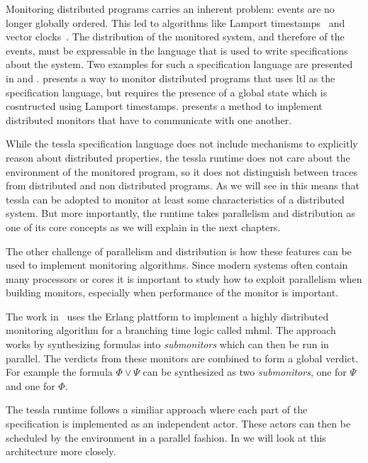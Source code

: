 Monitoring distributed programs carries an inherent problem: events are no longer globally ordered.
This led to algorithms like Lamport timestamps~\citep{Lamport1978} and vector clocks~\citep{Fidge1988}.
The distribution of the monitored system, and therefore of the events, must be expressable in the language that is used to write specifications about the system.
Two examples for such a specification language are presented in \cite{Sen2004} and \cite{Ehrich2000}.
\cite{Mostafa2015} presents a way to monitor distributed programs that uses \gls{ltl} as the specification language, but requires the presence of a global state which is cosntructed using Lamport timestamps.
\cite{Mostafa2015} presents a method to implement distributed monitors that have to communicate with one another.

While the \gls{tessla} specification language does not include mechanisms to explicitly reason about distributed properties, the \gls{tessla} runtime does not care about the environment of the monitored program, so it does not distinguish between traces from distributed and non distributed programs.
As we will see in  this means that \gls{tessla} can be adopted to monitor at least some characteristics of a distributed system.
But more importantly, the runtime takes parallelism and distribution as one of its core concepts as we will explain in the next chapters.

The other challenge of parallelism and distribution is how these features can be used to implement monitoring algorithms.
Since modern systems often contain many processors or cores it is important to study how to exploit parallelism when building monitors, especially when performance of the monitor is important.

The work in~\cite{Attard2016} uses the Erlang plattform to implement a highly distributed monitoring algorithm for a branching time logic called \gls{mhml}.
The approach works by synthesizing formulas into \emph{submonitors} which can then be run in parallel.
The verdicts from these monitors are combined to form a global verdict.
For example the formula \(\Phi \vee \Psi\) can be synthesized as two \emph{submonitors}, one for \(\Psi\) and one for \(\Phi\).

The \gls{tessla} runtime follows a similiar approach where each part of the specification is implemented as an independent actor.
These actors can then be scheduled by the environment in a parallel fashion.
In  we will look at this architecture more closely.


